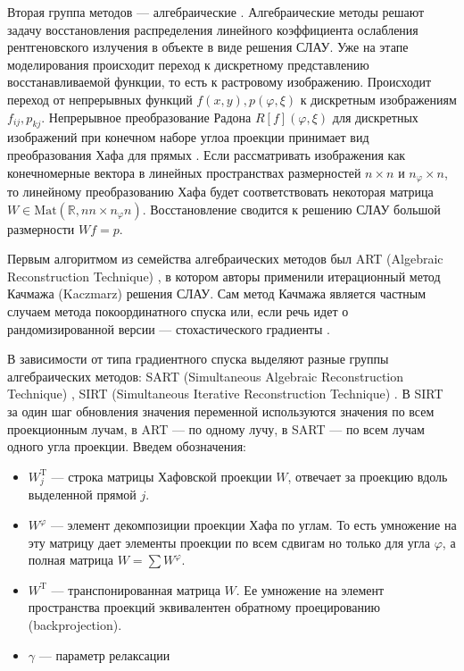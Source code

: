 Вторая группа методов --- алгебраические \cite{algebraic_methods}. 
Алгебраические методы решают задачу восстановления распределения линейного коэффициента ослабления рентгеновского излучения в объекте в виде решения СЛАУ.
Уже на этапе моделирования происходит переход к дискретному представлению восстанавливаемой функции, то есть к растровому изображению.
Происходит переход от непрерывных функций $f(x,y), p(\varphi, \xi)$ к дискретным изображениям $f_{ij}, p_{kj}$.
Непрерывное преобразование Радона $R[f](\varphi, \xi)$ для дискретных изображений при конечном наборе углоа проекции принимает вид преобразования Хафа для прямых \cite{Ginkel04ashort}.
Если рассматривать изображения как конечномерные вектора в линейных пространствах размерностей $n \times n$ и $n_\varphi \times n$, то линейному преобразованию Хафа будет соответствовать некоторая матрица $W \in \mathrm{Mat}(\mathbb R, n n \times n_\varphi n)$.
Восстановление сводится к решению СЛАУ большой размерности $Wf = p$.

Первым алгоритмом из семейства алгебраических методов был ART (Algebraic Reconstruction Technique) \cite{GORDON1970471}, в котором авторы применили итерационный метод Качмажа (Kaczmarz) \cite{Kaczmarz1937} решения СЛАУ.
Сам метод Качмажа является частным случаем метода покоординатного спуска или, если речь идет о рандомизированной версии --- стохастического градиенты \cite{needell2014stochastic}.

В зависимости от типа градиентного спуска выделяют разные группы алгебраических методов: SART (Simultaneous Algebraic Reconstruction Technique) \cite{sart}, SIRT (Simultaneous Iterative Reconstruction Technique) \cite{GILBERTSIRT, gregor2008computational}.
В SIRT за один шаг обновления значения переменной используются значения по всем проекционным лучам, в ART --- по одному лучу, в SART --- по всем лучам одного угла проекции.
Введем обозначения: 

\begin{itemize}
	\item $W^{\mathrm T}_j$ --- строка матрицы Хафовской проекции $W$, отвечает за проекцию вдоль выделенной прямой $j$.
	\item $W^\varphi$ --- элемент декомпозиции проекции Хафа по углам. То есть умножение на эту матрицу дает элементы проекции по всем сдвигам но только для угла $\varphi$, а полная матрица $W = \sum W^\varphi$.
	\item $W^{\mathrm T}$ --- транспонированная матрица $W$. Ее умножение на элемент пространства проекций эквивалентен обратному проецированию (backprojection).
	\item $\gamma$ --- параметр релаксации
\end{itemize}

